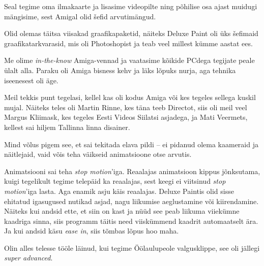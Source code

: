 Seal tegime oma ilmakaarte ja lisasime videopilte ning põhilise osa ajast 
muidugi mängisime, sest Amigal olid šefid arvutimängud. 


Olid olemas täitsa viisakad graafikapaketid, näiteks Deluxe Paint oli üks šefimaid graafikatarkvarasid, mis oli 
Photoshopist ja teab veel millest kümme aastat ees. 

Me olime \emph{in-the-know} Amiga-vennad ja vaatasime kõikide 
PCdega tegijate peale ülalt alla. Paraku oli Amiga bisness kehv ja 
läks lõpuks nurja, aga tehnika iseenesest oli äge. 

Meil tekkis punt tegelasi, kellel kas oli kodus Amiga või kes 
tegeles sellega kuskil mujal. Näiteks teles oli Martin Rinne, kes 
täna teeb Directot,
siis oli meil veel Margus Kliimask, kes tegeles 
Eesti 
Videos Siilatsi asjadega, ja Mati 
Veermets, kellest sai hiljem Tallinna linna disainer.

Mind võlus pigem see, et sai tekitada 
elava pildi – ei pidanud olema kaameraid ja näitlejaid, vaid 
võis teha väikseid animatsioone otse arvutis.


Animatsiooni sai teha \emph{stop 
motion}'iga. Reaalajas animatsioon kippus jõnksutama, kuigi 
tegelikult tegime telepäid ka reaalajas, sest keegi ei viitsinud 
\emph{stop motion}'iga lasta. Aga enamik asju käis 
reaalajas. Deluxe Paintis olid sisse ehitatud igasugused 
nutikad asjad, nagu liikumise aeglustamine või kiirendamine. Näiteks kui andsid 
ette, et siin on kast ja nüüd see peab liikuma 
viiekümne kaadriga sinna, siis programm täitis need 
viiskümmend kaadrit automaatselt ära. Ja kui andsid käsu \emph{ease in}, siis 
tõmbas lõpus hoo maha. 

Olin alles telesse tööle läinud, kui tegime 
Öölaulupeole 
valgusklippe, see oli jällegi \emph{super advanced}.

